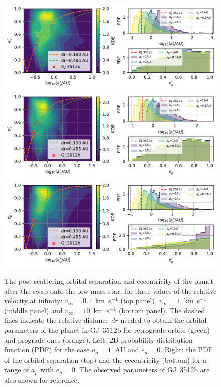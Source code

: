 \documentclass[twocolumn]{aastex62}
\begin{document}
\begin{figure}
\includegraphics[width=2\columnwidth]{letter-new-ae-01}\\
\includegraphics[width=2\columnwidth]{letter-new-ae-1}\\
 \includegraphics[width=2\columnwidth]{letter-new-ae}
  \caption{The post scattering orbital separation and eccentricity of the planet after the swap onto the low-mass star, for three values of the relative velocity at infinity: $v_\infty=0.1$~km~s$^{-1}$ (top panel), $v_\infty=1$~km~s$^{-1}$ (middle panel) and $v_\infty=10$~km~s$^{-1}$ (bottom panel). 
  The dashed lines indicate the relative distance $dr$ 
  needed to obtain the orbital parameters of the planet in GJ~3512b for retrograde orbits (green) and prograde ones (orange).
  Left: 2D probability distribution function (PDF) for the case $a_p=1$~AU and $e_p=0$. Right: the PDF of the orbital separation (top) and the eccentricity (bottom) for a range of $a_p$ with $e_p=0$. The observed parameters of GJ~3512b are also shown for reference. }
 \label{fig:orbits}
\end{figure}
\end{document}
